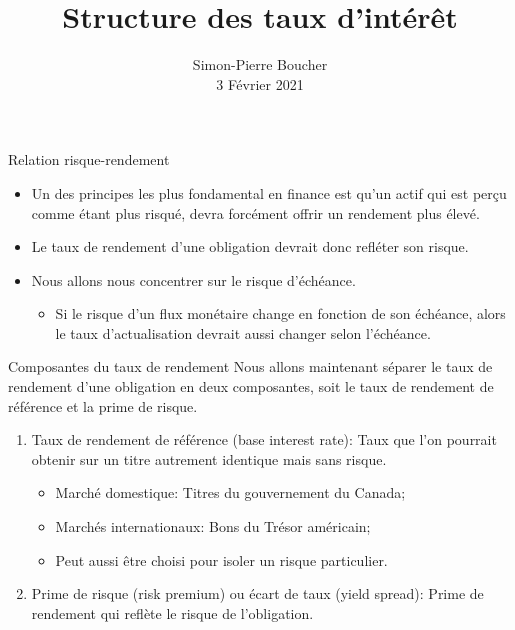 \documentclass[11pt]{beamer}
\date{}
\author{Simon-Pierre Boucher \\ 3 Février 2021}
\title{Structure des taux d’intérêt}
\begin{document}
\begin{frame}
\titlepage
\end{frame}

\begin{frame}{Relation risque-rendement}
\begin{itemize}
\item Un des principes les plus fondamental en finance est qu'un actif qui est perçu comme étant plus risqué,  devra forcément offrir un rendement plus élevé. 
\item Le taux de rendement d’une obligation devrait donc refléter son risque. 
\item Nous allons nous concentrer sur le risque d'échéance.
\begin{itemize}
\item Si le risque d’un flux monétaire change en fonction de son échéance,  alors le taux d’actualisation devrait aussi changer selon l’échéance.
\end{itemize}
\end{itemize}
\end{frame}
\begin{frame}{Composantes du taux de rendement}
Nous allons maintenant séparer le taux de rendement d'une obligation en deux composantes,  soit le taux de rendement de référence et la prime de risque.

\begin{enumerate}
\item Taux de rendement de référence (base interest rate): Taux que l’on pourrait obtenir sur un titre autrement identique mais sans risque.
\begin{itemize}
\item Marché domestique: Titres du gouvernement du Canada;
\item Marchés internationaux: Bons du Trésor américain;
\item Peut aussi être choisi pour isoler un risque particulier.
\end{itemize}
\item Prime de risque (risk premium) ou écart de taux (yield spread): Prime de rendement qui reflète le risque de l’obligation.
\end{enumerate}
\end{frame}
\end{document}
